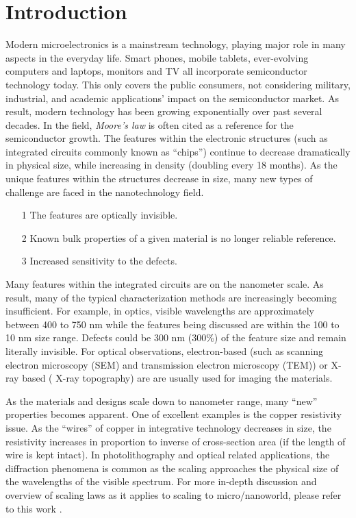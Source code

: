 %

\tableofcontents
\listoffigures
\listoftables
\mainmatter
\chapter{Introduction}

Modern microelectronics is a mainstream technology, playing major role in many aspects in the everyday life.  Smart phones, mobile tablets, ever-evolving computers and laptops, monitors and TV all incorporate semiconductor technology today.  This only covers the public consumers, not considering military, industrial, and academic applications' impact on the semiconductor market.  As result, modern technology has been growing exponentially over past several decades.  In the field, \textit{Moore's law} is often cited as a reference for the semiconductor growth.  The features within the electronic structures (such as integrated circuits commonly known as ``chips'') continue to decrease dramatically in physical size, while increasing in density (doubling every 18 months).  As the unique features within the structures decrease in size, many new types of challenge are faced in the nanotechnology field.  

{\SingleSpacing
\begin{itemize}
\item[1] The features are optically invisible.
\item[2] Known bulk properties of a given material is no longer reliable reference.
\item[3] Increased sensitivity to the defects.
\end{itemize}
}

Many features within the integrated circuits are on the nanometer scale.  As result, many of the typical characterization methods are increasingly becoming insufficient. For example, in optics,  visible wavelengths are approximately between 400 to 750 nm while the features being discussed are within the 100 to 10 nm size range.  Defects could be 300 nm (300\%) of  the feature size and remain literally invisible.  For optical observations, electron-based (such as scanning electron microscopy (SEM) and transmission electron microscopy (TEM)) or X-ray based ( X-ray topography) are are usually used for imaging the materials.  

As the materials and designs scale down to nanometer range, many ``new'' properties becomes apparent.  One of excellent examples is the copper resistivity issue.  As the ``wires'' of copper in integrative technology decreases in size, the resistivity increases in proportion to inverse of cross-section area (if the length of wire is kept intact).  In photolithography and optical related applications, the diffraction phenomena is common as the scaling approaches the physical size of the wavelengths of the visible spectrum.  For more in-depth discussion and overview of scaling laws as it applies to scaling to micro/nanoworld, please refer to this work \cite{Wautelet1}.

